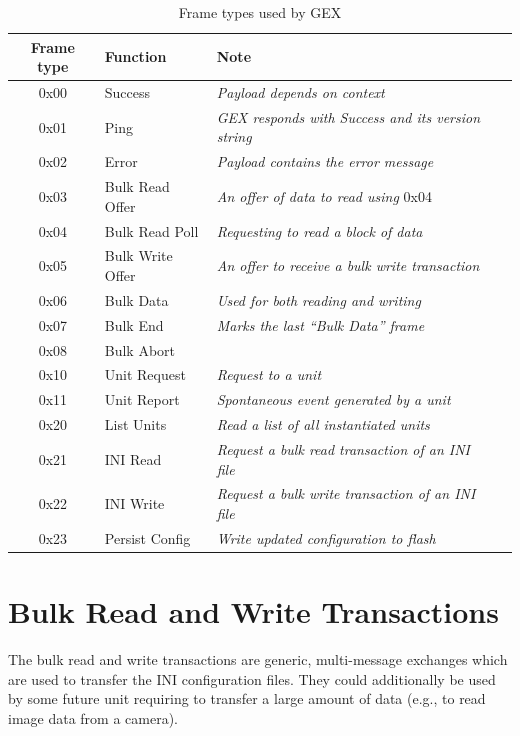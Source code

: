 \begin{table}[h]
	\centering
	\begin{tabular}{clll}
		\toprule
		\textbf{Frame type} & \textbf{Function} & \textbf{Note} \\
		\midrule
		0x00 & Success & \textit{Payload depends on context} \\
		0x01 & Ping & \textit{GEX responds with Success and its version string} \\
		0x02 & Error & \textit{Payload contains the error message} \\
		\midrule
		0x03 & Bulk Read Offer & \textit{An offer of data to read using }0x04 \\
		0x04 & Bulk Read Poll & \textit{Requesting to read a block of data} \\
		0x05 & Bulk Write Offer & \textit{An offer to receive a bulk write transaction} \\
		0x06 & Bulk Data & \textit{Used for both reading and writing} \\
		0x07 & Bulk End & \textit{Marks the last ``Bulk Data'' frame} \\
		0x08 & Bulk Abort & \textit{} \\
		\midrule
		0x10 & Unit Request & \textit{Request to a unit} \\
		0x11 & Unit Report & \textit{Spontaneous event generated by a unit} \\
		\midrule
		0x20 & List Units & \textit{Read a list of all instantiated units} \\
		0x21 & INI Read & \textit{Request a bulk read transaction of an INI file} \\
		0x22 & INI Write & \textit{Request a bulk write transaction of an INI file} \\
		0x23 & Persist Config & \textit{Write updated configuration to flash} \\
		\bottomrule
	\end{tabular}
\caption{\label{fig:tf-types}Frame types used by GEX}
\end{table}


\section{Bulk Read and Write Transactions} \label{sec:tf-bulk-rw}

The bulk read and write transactions are generic, multi-message exchanges which are used to transfer the INI configuration files. They could additionally be used by some future unit requiring to transfer a large amount of data (e.g., to read image data from a camera).

